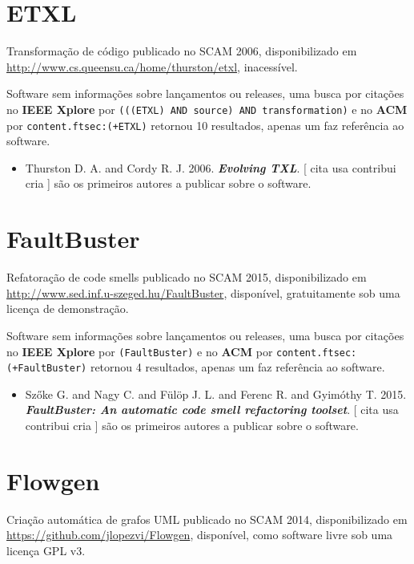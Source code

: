 \section{ETXL}

Transformação de código
publicado no SCAM 2006,
disponibilizado em \url{http://www.cs.queensu.ca/home/thurston/etxl},
inacessível.

Software sem informações sobre lançamentos ou releases,
uma busca por citações no {\bf IEEE Xplore} por
\texttt{(((ETXL) AND source) AND transformation)}
e no {\bf ACM} por
\texttt{content.ftsec:(+ETXL)}
retornou
10 resultados,
apenas um faz referência ao software.

\begin{itemize}
\item Thurston D. A. and Cordy R. J.
      2006.
        \textbf{\textit{ Evolving TXL}}.
      [
          cita
          usa
          contribui
          cria
      ]
são os primeiros autores a publicar sobre o software.
\end{itemize}
\section{FaultBuster}

Refatoração de code smells
publicado no SCAM 2015,
disponibilizado em \url{http://www.sed.inf.u-szeged.hu/FaultBuster},
disponível,
gratuitamente
sob uma licença de demonstração.

Software sem informações sobre lançamentos ou releases,
uma busca por citações no {\bf IEEE Xplore} por
\texttt{(FaultBuster)}
e no {\bf ACM} por
\texttt{content.ftsec:(+FaultBuster)}
retornou
4 resultados,
apenas um faz referência ao software.

\begin{itemize}
\item Szőke G. and Nagy C. and Fülöp J. L. and Ferenc R. and Gyimóthy T.
      2015.
        \textbf{\textit{ FaultBuster: An automatic code smell refactoring toolset}}.
      [
          cita
          usa
          contribui
          cria
      ]
são os primeiros autores a publicar sobre o software.
\end{itemize}
\section{Flowgen}

Criação automática de grafos UML
publicado no SCAM 2014,
disponibilizado em \url{https://github.com/jlopezvi/Flowgen},
disponível,
como software livre
sob uma licença GPL v3.

